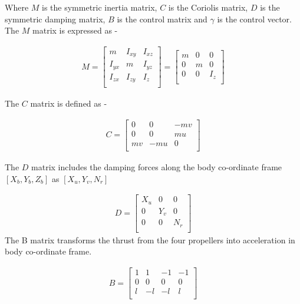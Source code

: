 \documentclass[12pt,titlepage]{article}
\begin{document}
Where $M$ is the symmetric inertia matrix, $C$ is the Coriolis matrix, $D$ is the symmetric damping matrix, $B$ is the control matrix and $\gamma$ is the control vector. The $M$ matrix is expressed as - 

\begin{align}
M = 
\begin{bmatrix}
    m & I_{xy} & I_{xz} \\
    I_{yx} & m & I_{yz} \\
    I_{zx} & I_{zy} & I_{z} \\
\end{bmatrix}
= 
\begin{bmatrix}
    m & 0 & 0 \\
    0 & m & 0 \\
    0 & 0 & I_{z} \\
\end{bmatrix}
\end{align}
\newpage 

The $C$ matrix is defined as - 

\begin{align}
C = 
\begin{bmatrix}
    0 & 0 & -mv \\
    0 & 0 & mu \\
    mv & -mu & 0 \\
\end{bmatrix}
\end{align}

The $D$ matrix includes the damping forces along the body co-ordinate frame $[X_b,Y_b,Z_b]$ as $[X_u, Y_v, N_r]$

\begin{align}
D = 
\begin{bmatrix}
    X_u & 0 & 0 \\
    0 & Y_v & 0 \\
    0 & 0 & N_r \\
\end{bmatrix}
\end{align}
The B matrix transforms the thrust from the four propellers into acceleration in body co-ordinate frame. 

\begin{align}
B =
\begin{bmatrix}
    1 & 1 & -1 & -1\\
    0 & 0 & 0 & 0\\
    l & -l & -l & l \\
\end{bmatrix}
\end{align}
\end{document}
